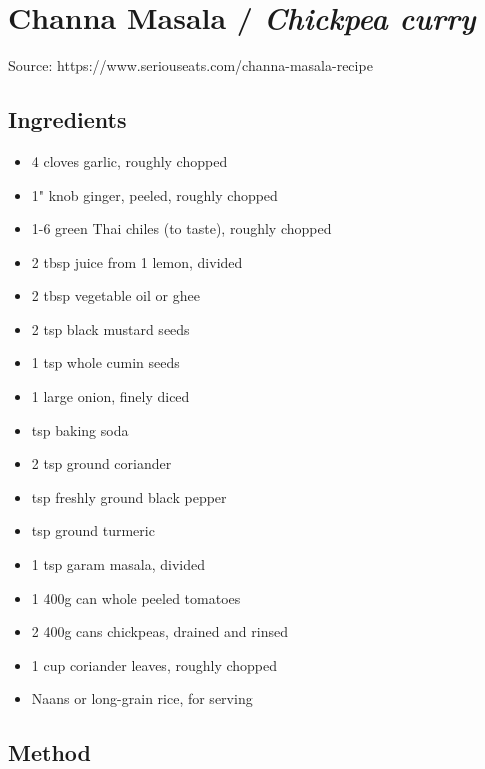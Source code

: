 \clearpage
\section{Channa Masala / \emph{Chickpea curry}}


Source: https://www.seriouseats.com/channa-masala-recipe

\subsection{Ingredients}

\begin{itemize}
    \item 4 cloves garlic, roughly chopped
    \item 1" knob ginger, peeled, roughly chopped
    \item 1-6 green Thai chiles (to taste), roughly chopped
    \item 2 tbsp juice from 1 lemon, divided
    \item 2 tbsp vegetable oil or ghee
    \item 2 tsp black mustard seeds
    \item 1 tsp whole cumin seeds
    \item 1 large onion, finely diced
    \item {} tsp baking soda
    \item 2 tsp ground coriander
    \item {} tsp freshly ground black pepper
    \item {} tsp ground turmeric
    \item 1 tsp garam masala, divided
    \item 1 400g can whole peeled tomatoes
    \item 2 400g cans chickpeas, drained and rinsed
    \item 1 cup coriander leaves, roughly chopped
    \item Naans or long-grain rice, for serving
\end{itemize}

\subsection{Method}


